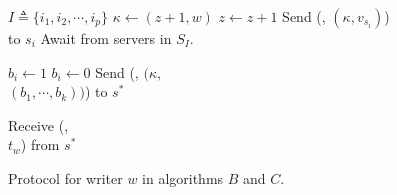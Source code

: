 \begin{algorithm}[!ht]
	\label{app:algrithmBC}
	\begin{algorithmic}[3]
		
		\begin{multicols}{1}{\footnotesize
				\EndPart
				
				\State $I\triangleq \{i_1, i_2, \cdots, i_p \}$
				\Part{ \underline{\writeValue}} {
					\State ${\kappa} \leftarrow (z +1,  w)$
					\State $z \leftarrow z +1 $
					\State Send (\writeValueTag, $({\kappa}, v_{s_i})$) \\ to $s_i$
					\EndFor 
					\State  Await {\ackTag} from servers in  $S_I$.
				}\EndPart
				\Statex
				\Part{ \underline{\informSerializer}} {
					
					\State $b_i \leftarrow 1$
					\Else
					\State $b_i \leftarrow 0$
					\EndIf
					\EndFor 
					\State  Send  (\informSerializerTag, $({\kappa},$
					\\ $(b_{1}, \cdots, b_{k}))$) to   $s^*$
					
					\State Receive ({\ackTag}, 
					\\$t_w$) from $s^*$
				}\EndPart
		}\end{multicols}
	\end{algorithmic} 
	\caption{Protocol for writer $w$ in algorithms $B$ and $C$.}\label{fig:algo_bc}
	          \vspace{-1.2em}
\end{algorithm}



